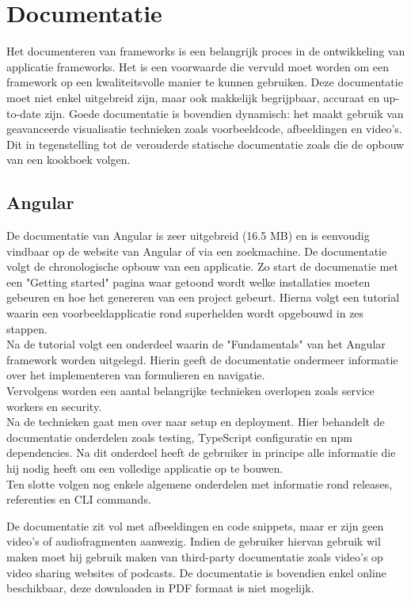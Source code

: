 \section{Documentatie}
Het documenteren van frameworks is een belangrijk proces in de ontwikkeling van applicatie frameworks. Het is een voorwaarde die vervuld moet worden om een framework op een kwaliteitsvolle manier te kunnen gebruiken. Deze documentatie moet niet enkel uitgebreid zijn, maar ook makkelijk begrijpbaar, accuraat en up-to-date zijn. Goede documentatie is bovendien dynamisch: het maakt gebruik van geavanceerde visualisatie technieken zoals voorbeeldcode, afbeeldingen en video's. Dit in tegenstelling tot de verouderde statische documentatie zoals die de opbouw van een kookboek volgen. 

\subsection{Angular}
De documentatie van Angular \autocite{Angular2019} is zeer uitgebreid (16.5 MB) en is eenvoudig vindbaar op de website van Angular of via een zoekmachine. De documentatie volgt de chronologische opbouw van een applicatie. Zo start de documenatie met een "Getting started" pagina waar getoond wordt welke installaties moeten gebeuren en hoe het genereren van een project gebeurt. 
Hierna volgt een tutorial waarin een voorbeeldapplicatie rond superhelden wordt opgebouwd in zes stappen. \\ Na de tutorial volgt een onderdeel waarin de "Fundamentals" van het Angular framework worden uitgelegd. Hierin geeft de documentatie ondermeer informatie over het implementeren van formulieren en navigatie. \\
Vervolgens worden een aantal belangrijke technieken overlopen zoals service workers en security.  \\
Na de technieken gaat men over naar setup en deployment. Hier behandelt de documentatie onderdelen zoals testing, TypeScript configuratie en npm dependencies. Na dit onderdeel heeft de gebruiker in principe alle informatie die hij nodig heeft om een volledige applicatie op te bouwen.\\
Ten slotte volgen nog enkele algemene onderdelen met informatie rond releases, referenties en CLI commands. 

De documentatie zit vol met afbeeldingen en code snippets, maar er zijn geen video's of audiofragmenten aanwezig. Indien de gebruiker hiervan gebruik wil maken moet hij gebruik maken van third-party documentatie zoals video's op video sharing websites of podcasts. De documentatie is bovendien enkel online beschikbaar, deze downloaden in PDF formaat is niet mogelijk. 

